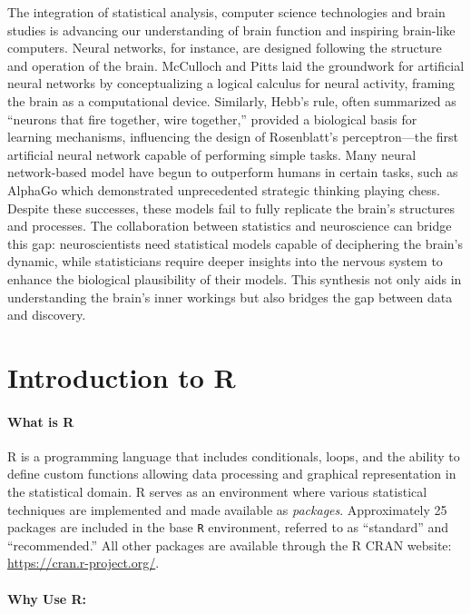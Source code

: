\documentclass[
]{article}
\begin{document}
The integration of statistical analysis, computer science technologies
and brain studies is advancing our understanding of brain function and
inspiring brain-like computers. Neural networks, for instance, are
designed following the structure and operation of the brain. McCulloch
and Pitts laid the groundwork for artificial neural networks by
conceptualizing a logical calculus for neural activity, framing the
brain as a computational device. Similarly, Hebb's rule, often
summarized as ``neurons that fire together, wire together,'' provided a
biological basis for learning mechanisms, influencing the design of
Rosenblatt's perceptron---the first artificial neural network capable of
performing simple tasks. Many neural network-based model have begun to
outperform humans in certain tasks, such as AlphaGo which demonstrated
unprecedented strategic thinking playing chess. Despite these successes,
these models fail to fully replicate the brain's structures and
processes. The collaboration between statistics and neuroscience can
bridge this gap: neuroscientists need statistical models capable of
deciphering the brain's dynamic, while statisticians require deeper
insights into the nervous system to enhance the biological plausibility
of their models. This synthesis not only aids in understanding the
brain's inner workings but also bridges the gap between data and
discovery.

\hypertarget{introduction-to-r}{%
\section{Introduction to R}\label{introduction-to-r}}

\hypertarget{what-is-r}{%
\paragraph{What is R}\label{what-is-r}}

R is a programming language that includes conditionals, loops, and the
ability to define custom functions allowing data processing and
graphical representation in the statistical domain. R serves as an
environment where various statistical techniques are implemented and
made available as \emph{packages}. Approximately 25 packages are
included in the base \texttt{R} environment, referred to as ``standard''
and ``recommended.'' All other packages are available through the R CRAN
website: \url{https://cran.r-project.org/}.

\hypertarget{why-use-r}{%
\paragraph{Why Use R:}\label{why-use-r}}
\end{document}
